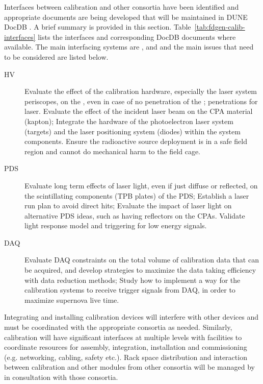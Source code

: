 

Interfaces between calibration and other consortia have been identified and appropriate documents are being developed that will be maintained in DUNE DocDB
. A brief summary is provided in this section. Table~\ref{tab:fdgen-calib-interfaces} lists the 
interfaces and corresponding DocDB documents where available. 
The main interfacing systems are ,  and  and the main issues that need to be considered are listed below.

\begin{description}
    \item[HV] Evaluate the effect of the calibration hardware, especially the laser system periscopes, on the \efield, even in case of no penetration of the ;  penetrations for laser. Evaluate the effect of the incident laser beam on the CPA material (kapton); Integrate the hardware of the %
    photoelectron laser system (targets) and the laser positioning system (diodes) within the  system components. Ensure the radioactive source deployment is in a safe field region and cannot do mechanical harm to the field cage.
    \item[PDS] Evaluate long term effects of laser light, even if just diffuse or reflected, on the scintillating components (TPB plates) of the PDS; Establish a laser run plan to avoid direct hits; Evaluate the impact of laser light on alternative PDS ideas, such as having reflectors on the CPAs. Validate light response model and triggering for low energy signals.
    \item[DAQ] Evaluate DAQ constraints on the total volume of calibration data that can be acquired, and develop strategies to maximize the data taking efficiency with data reduction methods; Study how to implement a way for the calibration systems to receive trigger signals from DAQ, in order to maximize supernova live time.
\end{description}

Integrating and installing calibration devices will interfere with other devices and must be coordinated with the appropriate consortia as needed. Similarly, calibration will have significant interfaces at multiple levels with facilities to coordinate resources for assembly, integration, installation and commissioning (e.g. networking, cabling, safety etc.). Rack space distribution and interaction between calibration and other modules from other consortia will be managed by  in consultation with those consortia.

